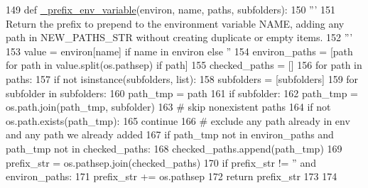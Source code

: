 \begin{DoxyCode}
149 \textcolor{keyword}{def }\hyperlink{namespace__setup__util_a74a1f8575ed82282d03f7795c9ba6e45}{\_prefix\_env\_variable}(environ, name, paths, subfolders):
150     \textcolor{stringliteral}{'''}
151 \textcolor{stringliteral}{    Return the prefix to prepend to the environment variable NAME, adding any path in NEW\_PATHS\_STR without
       creating duplicate or empty items.}
152 \textcolor{stringliteral}{    '''}
153     value = environ[name] \textcolor{keywordflow}{if} name \textcolor{keywordflow}{in} environ \textcolor{keywordflow}{else} \textcolor{stringliteral}{''}
154     environ\_paths = [path \textcolor{keywordflow}{for} path \textcolor{keywordflow}{in} value.split(os.pathsep) \textcolor{keywordflow}{if} path]
155     checked\_paths = []
156     \textcolor{keywordflow}{for} path \textcolor{keywordflow}{in} paths:
157         \textcolor{keywordflow}{if} \textcolor{keywordflow}{not} isinstance(subfolders, list):
158             subfolders = [subfolders]
159         \textcolor{keywordflow}{for} subfolder \textcolor{keywordflow}{in} subfolders:
160             path\_tmp = path
161             \textcolor{keywordflow}{if} subfolder:
162                 path\_tmp = os.path.join(path\_tmp, subfolder)
163             \textcolor{comment}{# skip nonexistent paths}
164             \textcolor{keywordflow}{if} \textcolor{keywordflow}{not} os.path.exists(path\_tmp):
165                 \textcolor{keywordflow}{continue}
166             \textcolor{comment}{# exclude any path already in env and any path we already added}
167             \textcolor{keywordflow}{if} path\_tmp \textcolor{keywordflow}{not} \textcolor{keywordflow}{in} environ\_paths \textcolor{keywordflow}{and} path\_tmp \textcolor{keywordflow}{not} \textcolor{keywordflow}{in} checked\_paths:
168                 checked\_paths.append(path\_tmp)
169     prefix\_str = os.pathsep.join(checked\_paths)
170     \textcolor{keywordflow}{if} prefix\_str != \textcolor{stringliteral}{''} \textcolor{keywordflow}{and} environ\_paths:
171         prefix\_str += os.pathsep
172     \textcolor{keywordflow}{return} prefix\_str
173 
174 
\end{DoxyCode}
